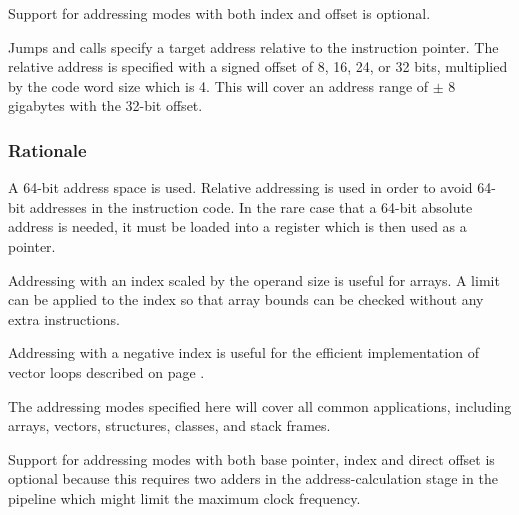 \documentclass[forwardcom.tex]{subfiles}
\begin{document}
Support for addressing modes with both index and offset is optional.
\vspace{2mm}

Jumps and calls specify a target address relative to the instruction pointer. The relative address is specified with a signed offset of 8, 16, 24, or 32 bits, multiplied by the code word size which is 4. This will cover an address range of
$\pm$ 8 gigabytes with the 32-bit offset.
\vspace{2mm}

\subsubsection{Rationale}
A 64-bit address space is used. Relative addressing is used in order to avoid 64-bit addresses in the instruction code. In the rare case that a 64-bit absolute address is needed, it must be loaded into a register which is then used as a pointer.
\vspace{2mm}

Addressing with an index scaled by the operand size is useful for arrays. A limit can be applied to the index so that array bounds can be checked without any extra instructions.
\vspace{2mm}

Addressing with a negative index is useful for the efficient implementation of vector loops described on page \pageref{vectorLoops}.
\vspace{2mm}

The addressing modes specified here will cover all common applications, including arrays, vectors, structures, classes, and stack frames.
\vspace{2mm}

Support for addressing modes with both base pointer, index and direct offset is optional because this requires two adders in the address-calculation stage in the pipeline which might limit the maximum clock frequency.
\end{document}
